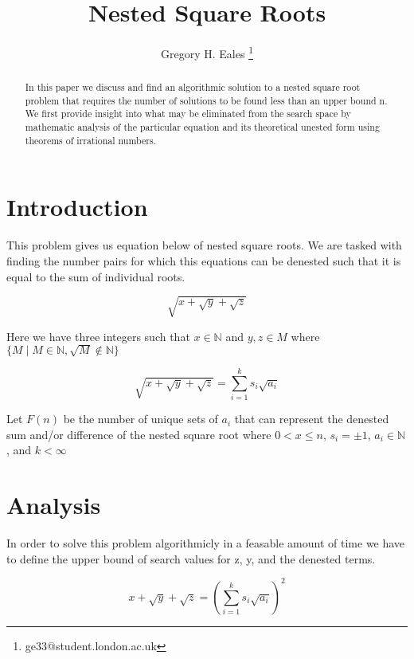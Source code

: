 \documentclass[12pt, letterpaper]{article}
\title{Nested Square Roots}
\author{Gregory H. Eales \thanks{ge33@student.london.ac.uk}}
\begin{document}
\maketitle

\begin{abstract}
In this paper we discuss and find an algorithmic solution to a nested square root problem that requires the number of solutions to be found less than an upper bound n. We first provide insight into what may be eliminated from the search space by mathematic analysis of the particular equation and its theoretical unested form using theorems of irrational numbers.



\end{abstract}

\section{Introduction}

This problem gives us equation below of nested square roots. We are tasked with finding the number pairs for which this equations can be denested such that it is equal to the sum of individual roots.

\begin{equation}
\sqrt{x + \sqrt{y} + \sqrt{z}}
\end{equation}

Here we have three integers such that $x \in  \mathbb{N}$ and $ y, z \in M$ where $  \{M \mid M \in \mathbb{N}, \sqrt{M} \notin\mathbb{N} \}$


\begin{equation}
\sqrt{x + \sqrt{y} + \sqrt{z}} = \sum_{i=1}^{k} s_{i} \sqrt{a_{i}}
\end{equation}

Let $F(n)$ be the number of unique sets of $a_{i}$ that can represent the denested sum and/or difference of the nested square root where $0 < x \leq n $, $s_{i} = \pm 1$, $a_{i} \in \mathbb{N}$, and $k < \infty$



\section{Analysis}

In order to solve this problem algorithmicly in a feasable amount of time we have to define the upper bound of search values for z, y, and the denested terms.

\begin{equation}
x + \sqrt{y} + \sqrt{z} = (\sum_{i=1}^{k} s_{i} \sqrt{a_{i}})^{2}
\end{equation}
\end{document}
